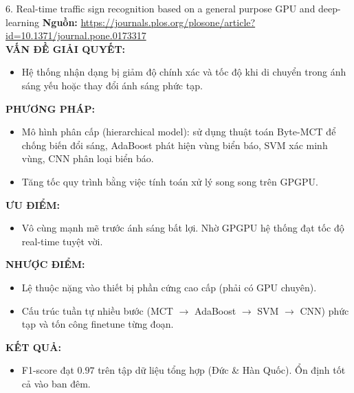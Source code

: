 \documentclass[12pt,a4paper]{article}
\newcommand{\subheading}[1]{\vspace{0.3cm}\noindent\textbf{\textcolor{primary}{\MakeUppercase{#1}:}}\par\vspace{0.1cm}}
\begin{document}
\vspace{0.5cm}

\begin{paperbox}{6. Real-time traffic sign recognition based on a general purpose GPU and deep-learning}
    \textbf{Nguồn:} \url{https://journals.plos.org/plosone/article?id=10.1371/journal.pone.0173317}\\

    \subheading{Vấn đề giải quyết}
    \begin{itemize}
        \item Hệ thống nhận dạng bị giảm độ chính xác và tốc độ khi di chuyển trong ánh sáng yếu hoặc thay đổi ánh sáng phức tạp.
    \end{itemize}

    \subheading{Phương pháp}
    \begin{itemize}
        \item Mô hình phân cấp (hierarchical model): sử dụng thuật toán Byte-MCT để chống biến đổi sáng, AdaBoost phát hiện vùng biển báo, SVM xác minh vùng, CNN phân loại biển báo.
        \item Tăng tốc quy trình bằng việc tính toán xử lý song song trên GPGPU.
    \end{itemize}

    \subheading{Ưu điểm}
    \begin{itemize}
        \item Vô cùng mạnh mẽ trước ánh sáng bất lợi. Nhờ GPGPU hệ thống đạt tốc độ real-time tuyệt vời.
    \end{itemize}

    \subheading{Nhược điểm}
    \begin{itemize}
        \item Lệ thuộc nặng vào thiết bị phần cứng cao cấp (phải có GPU chuyên).
        \item Cấu trúc tuần tự nhiều bước (MCT $\rightarrow$ AdaBoost $\rightarrow$ SVM $\rightarrow$ CNN) phức tạp và tốn công finetune từng đoạn.
    \end{itemize}

    \subheading{Kết quả}
    \begin{itemize}
        \item F1-score đạt $0.97$ trên tập dữ liệu tổng hợp (Đức \& Hàn Quốc). Ổn định tốt cả vào ban đêm.
    \end{itemize}
\end{paperbox}

\vspace{0.5cm}
\end{document}
